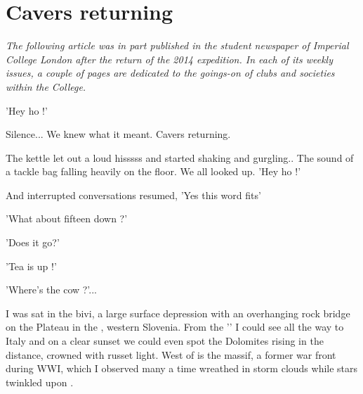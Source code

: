 \section{Cavers returning}

\begin{marginfigure}
\end{marginfigure}

\textit{The following article was in part published in the student newspaper of Imperial College London  after the return of the 2014 expedition. In each of its weekly issues, a couple of pages are dedicated to the goings-on of clubs and societies within the College.}

'Hey ho !' 

Silence...  We knew what it meant. Cavers returning. 

The kettle let out a loud hisssss and started shaking and gurgling.. The sound of a tackle bag falling heavily on the floor. 
We all looked up. 'Hey ho !'

And interrupted conversations resumed, 'Yes this word fits'

'What about fifteen down ?'

'Does it go?'

'Tea is up !'

'Where's the cow ?'...

I was sat in the bivi, a large surface depression with an overhanging rock bridge on the  Plateau in the , western Slovenia. From the '' I could see all the way to Italy and on a clear sunset we could even spot the Dolomites rising in the distance, crowned with russet light. West of  is the  massif, a former war front during WWI, which I observed many a time wreathed in storm clouds while stars twinkled upon .


